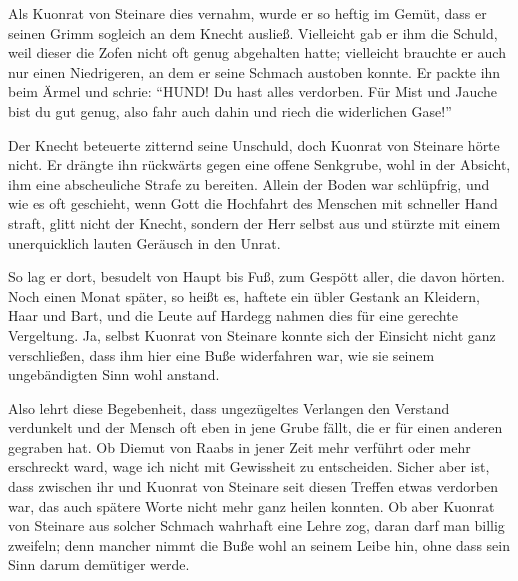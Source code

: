 Als \gls{Kuonrat von Steinare} dies vernahm, wurde er so heftig im Gemüt, dass er seinen Grimm sogleich an dem \gls{Knecht} ausließ. Vielleicht gab er ihm die Schuld, weil dieser die Zofen nicht oft genug abgehalten hatte; vielleicht brauchte er auch nur einen Niedrigeren, an dem er seine Schmach austoben konnte. Er packte ihn beim Ärmel und schrie: \enquote{HUND! Du hast alles verdorben. Für Mist und Jauche bist du gut genug, also fahr auch dahin und riech die widerlichen Gase!}

Der \gls{Knecht} beteuerte zitternd seine Unschuld, doch \gls{Kuonrat von Steinare} hörte nicht. Er drängte ihn rückwärts gegen eine offene Senkgrube, wohl in der Absicht, ihm eine abscheuliche Strafe zu bereiten. Allein der Boden war schlüpfrig, und wie es oft geschieht, wenn Gott die Hochfahrt des Menschen mit schneller Hand straft, glitt nicht der Knecht, sondern der Herr selbst aus und stürzte mit einem unerquicklich lauten Geräusch in den Unrat.

So lag er dort, besudelt von Haupt bis Fuß, zum Gespött aller, die davon hörten. Noch einen Monat später, so heißt es, haftete ein übler Gestank an Kleidern, Haar und Bart, und die Leute auf \gls{Hardegg} nahmen dies für eine gerechte Vergeltung. Ja, selbst \gls{Kuonrat von Steinare} konnte sich der Einsicht nicht ganz verschließen, dass ihm hier eine Buße widerfahren war, wie sie seinem ungebändigten Sinn wohl anstand.

Also lehrt diese Begebenheit, dass ungezügeltes Verlangen den Verstand verdunkelt und der Mensch oft eben in jene Grube fällt, die er für einen anderen gegraben hat. Ob \gls{Diemut von Raabs} in jener Zeit mehr verführt oder mehr erschreckt ward, wage ich nicht mit Gewissheit zu entscheiden. Sicher aber ist, dass zwischen ihr und \gls{Kuonrat von Steinare} seit diesen Treffen etwas verdorben war, das auch spätere Worte nicht mehr ganz heilen konnten. Ob aber \gls{Kuonrat von Steinare} aus solcher Schmach wahrhaft eine Lehre zog, daran darf man billig zweifeln; denn mancher nimmt die Buße wohl an seinem Leibe hin, ohne dass sein Sinn darum demütiger werde.
